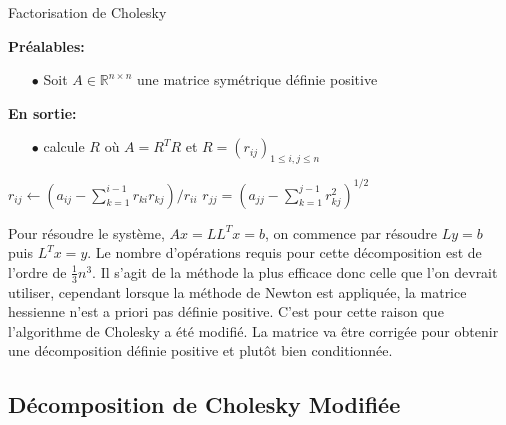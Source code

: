 \begin{description}
\begin{algorithm}                     %
\caption{Factorisation de Cholesky}          %
\label{alg:chol}                           %
\begin{algorithmic}  
\STATE \textbf{Pr\'ealables:} %
\begin{itemize}
\item[$\bullet$] Soit $A \in \mathbb{R}^{n\times n}$ une matrice sym\'etrique d\'efinie positive
\end{itemize}
\STATE \textbf{En sortie:} %
\begin{itemize}
\item[$\bullet$] calcule $R$ o\`u $A=R^TR$ et $R=(r_{ij})_{1\leq i,j\leq n}$
\end{itemize}
\STATE $r_{ij}\leftarrow(a_{ij}-\sum_{k=1}^{i-1}r_{ki}r_{kj})/r_{ii}$
\ENDFOR
\STATE $r_{jj}=(a_{jj}-\sum_{k=1}^{j-1}r_{kj}^2)^{1/2}$
\ENDFOR
\end{algorithmic}
\end{algorithm}


Pour r\'esoudre le syst\`eme, $Ax = LL^Tx = b$, on commence par r\'esoudre $Ly=b$ puis $L^Tx=y$.
Le nombre d'op\'erations requis pour cette d\'ecomposition est de l'ordre de $\frac{1}{3}n^3$. Il s'agit de la m\'ethode 
la plus efficace donc celle que l'on devrait utiliser, cependant lorsque la m\'ethode de Newton est appliqu\'ee,
la matrice hessienne n'est a priori pas d\'efinie positive. C'est pour cette raison que l'algorithme de Cholesky a \'et\'e 
modifi\'e. La matrice va être corrig\'ee pour obtenir une d\'ecomposition d\'efinie positive
 et plutôt bien conditionn\'ee.
\end{description}


\subsection{D\'ecomposition de Cholesky Modifi\'ee}
\label{chap1:decomposition}

